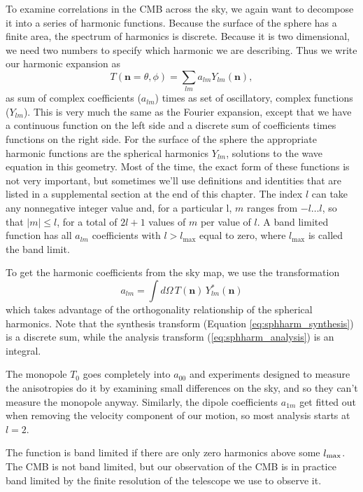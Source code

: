 To examine correlations in the CMB across the sky, we again want to decompose it into a series of harmonic functions.  Because the surface of the sphere has a finite area, the spectrum of harmonics is discrete.  Because it is two dimensional, we need two numbers to specify which harmonic we are describing.  Thus we write our harmonic expansion as 
\begin{equation}
  T(\mathbf{n} = \theta,\phi) = \sum_{lm} a_{lm} Y_{lm}(\mathbf{n}), \label{eq:sphharm_synthesis}
\end{equation}
as sum of complex coefficients ($a_{lm}$) times as set of oscillatory, complex functions ($Y_{lm}$).  This is very much the same as the Fourier expansion, except that we have a continuous function on the left side and a discrete sum of coefficients times functions on the right side. For the surface of the sphere the appropriate harmonic functions are the spherical harmonics $Y_{lm}$, solutions to the wave equation in this geometry.  Most of the time, the exact form of these functions is not very important, but sometimes we'll use definitions and identities that are listed in a supplemental section at the end of this chapter.  The index $l$ can take any nonnegative integer value and, for a particular l, $m$ ranges from $-l \dots l$, so that $|m| \leq l$, for a total of $2l + 1$ values of $m$ per value of $l$.
A band limited function has all $a_{lm}$ coefficients with $l > l_\textrm{max}$ equal to zero, where $l_\textrm{max}$ is called the band limit.

To get the harmonic coefficients from the sky map, we use the transformation
\begin{equation}
  a_{lm} = \int d\Omega\, T(\mathbf{n})\, Y^*_{lm}(\mathbf{n}) \label{eq:sphharm_analysis}
\end{equation}
which takes advantage of the orthogonality relationship of the spherical harmonics.  Note that the synthesis transform (Equation \ref{eq:sphharm_synthesis}) is a discrete sum, while the analysis transform (\ref{eq:sphharm_analysis}) is an integral.

The monopole $T_0$ goes completely into $a_{00}$ and experiments designed to measure the anisotropies do it by examining small differences on the sky, and so they can't measure the monopole anyway.  Similarly, the dipole coefficients $a_{1m}$ get fitted out when removing the velocity component of our motion, so most analysis starts at $l=2$.

The function is band limited if there are only zero harmonics above some $l_{\rm max}$.  The CMB is not band limited, but our observation of the CMB is in practice band limited by the finite resolution of the telescope we use to observe it.


